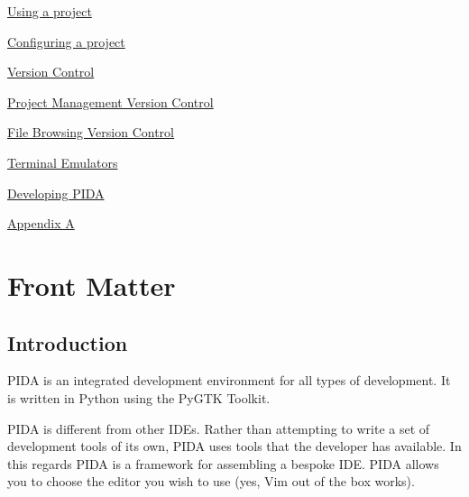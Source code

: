 \documentclass[10pt,a4paper,english]{article}
\begin{document}
\begin{list}{}{}
\begin{list}{}{}
\begin{list}{}{}
\item {} \href{\#using-a-project}{Using a project}

\item {} \href{\#configuring-a-project}{Configuring a project}

\end{list}

\item {} \href{\#version-control}{Version Control}
\begin{list}{}{}
\item {} \href{\#project-management-version-control}{Project Management Version Control}

\item {} \href{\#file-browsing-version-control}{File Browsing Version Control}

\end{list}

\item {} \href{\#terminal-emulators}{Terminal Emulators}

\end{list}

\item {} \href{\#developing-pida}{Developing PIDA}

\item {} \href{\#appendix-a}{Appendix A}

\end{list}




\hypertarget{front-matter}{}
\section*{Front Matter}



\hypertarget{introduction}{}
\subsection*{Introduction}

PIDA is an integrated development environment for all types of development. It
is written in Python using the PyGTK Toolkit.

PIDA is different from other IDEs. Rather than attempting to write a set of
development tools of its own, PIDA uses tools that the developer has available.
In this regards PIDA is a framework for assembling a bespoke IDE. PIDA allows
you to choose the editor you wish to use (yes, Vim out of the box works).
\end{document}
